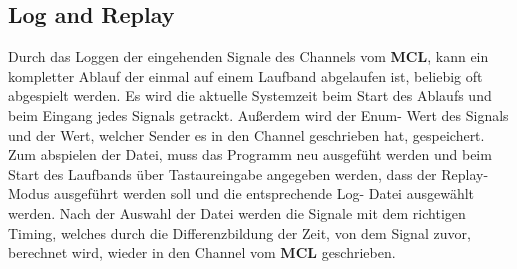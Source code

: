 \documentclass[
   draft=false
  ,paper=a4
  ,twoside=true
  ,fontsize=11pt
  ,headsepline
  ,DIV11
  ,parskip=full+
]{scrartcl} %
\begin{document}
\subsection{Log and Replay}
Durch das Loggen der eingehenden Signale des Channels vom \textbf{MCL}, kann ein kompletter Ablauf der einmal auf einem Laufband abgelaufen ist, beliebig oft abgespielt werden.
Es wird die aktuelle Systemzeit beim Start des Ablaufs und beim Eingang jedes Signals getrackt. Außerdem wird der Enum- Wert des Signals und der Wert, welcher Sender es in den Channel geschrieben hat, gespeichert.
\newline
Zum abspielen der Datei, muss das Programm neu ausgefüht werden und beim Start des Laufbands über Tastaureingabe angegeben werden, dass der Replay-Modus ausgeführt werden soll und die entsprechende Log- Datei ausgewählt werden.
\newline
Nach der Auswahl der Datei werden die Signale mit dem richtigen Timing, welches durch die Differenzbildung der Zeit, von dem Signal zuvor, berechnet wird, wieder in den Channel vom \textbf{MCL} geschrieben.
\end{document}
